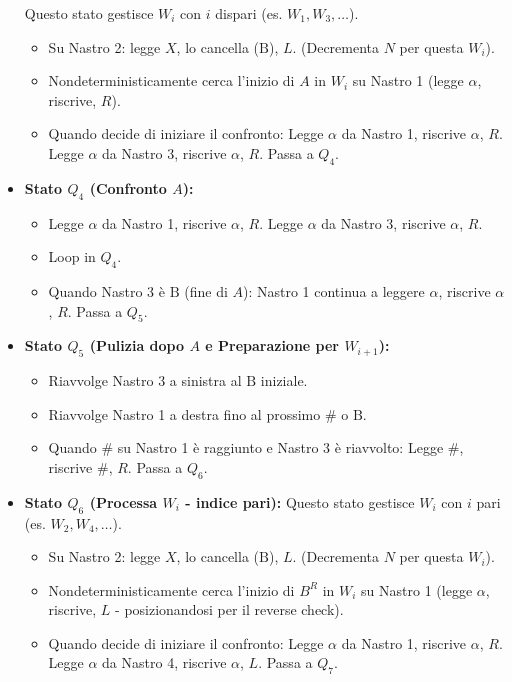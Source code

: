 \documentclass[a4paper]{article}
\newcommand{\B}{\text{B}} %
\begin{document}
\begin{itemize}
        Questo stato gestisce $W_i$ con $i$ dispari (es. $W_1, W_3, \dots$).
        \begin{itemize}
            \item Su Nastro 2: legge $X$, lo cancella ($\B$), $L$. (Decrementa $N$ per questa $W_i$).
            \item Nondeterministicamente cerca l'inizio di $A$ in $W_i$ su Nastro 1 (legge $\alpha$, riscrive, $R$).
            \item Quando decide di iniziare il confronto: Legge $\alpha$ da Nastro 1, riscrive $\alpha$, $R$. Legge $\alpha$ da Nastro 3, riscrive $\alpha$, $R$. Passa a $Q_4$.
        \end{itemize}
    \item \textbf{Stato $Q_4$ (Confronto $A$):}
        \begin{itemize}
            \item Legge $\alpha$ da Nastro 1, riscrive $\alpha$, $R$. Legge $\alpha$ da Nastro 3, riscrive $\alpha$, $R$.
            \item Loop in $Q_4$.
            \item Quando Nastro 3 è $\B$ (fine di $A$): Nastro 1 continua a leggere $\alpha$, riscrive $\alpha$, $R$. Passa a $Q_5$.
        \end{itemize}
    \item \textbf{Stato $Q_5$ (Pulizia dopo $A$ e Preparazione per $W_{i+1}$):}
        \begin{itemize}
            \item Riavvolge Nastro 3 a sinistra al $\B$ iniziale.
            \item Riavvolge Nastro 1 a destra fino al prossimo $\#$ o $\B$.
            \item Quando $\#$ su Nastro 1 è raggiunto e Nastro 3 è riavvolto: Legge $\#$, riscrive $\#$, $R$. Passa a $Q_6$.
        \end{itemize}
    \item \textbf{Stato $Q_6$ (Processa $W_i$ - indice pari):}
        Questo stato gestisce $W_i$ con $i$ pari (es. $W_2, W_4, \dots$).
        \begin{itemize}
            \item Su Nastro 2: legge $X$, lo cancella ($\B$), $L$. (Decrementa $N$ per questa $W_i$).
            \item Nondeterministicamente cerca l'inizio di $B^R$ in $W_i$ su Nastro 1 (legge $\alpha$, riscrive, $L$ - posizionandosi per il reverse check).
            \item Quando decide di iniziare il confronto: Legge $\alpha$ da Nastro 1, riscrive $\alpha$, $R$. Legge $\alpha$ da Nastro 4, riscrive $\alpha$, $L$. Passa a $Q_7$.

\end{itemize}
\end{itemize}
\end{document}
